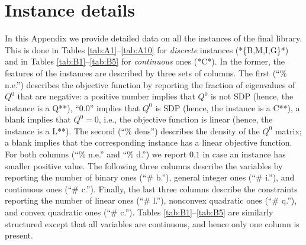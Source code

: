 
\section{Instance details}\label{sec:instance_details}


In this Appendix we provide detailed data on all the instances of the final library. This is done in Tables \ref{tab:A1}--\ref{tab:A10} for \emph{discrete} instances (*\{B,M,I,G\}*) and in Tables \ref{tab:B1}--\ref{tab:B5} for \emph{continuous} ones (*C*). In the former, the features of the instances are described by three sets of columns. The first (``\% n.e.'') describes the objective function by reporting the fraction of eigenvalues of $Q^0$ that are negative: a positive number implies that $Q^0$ is not SDP (hence, the instance is a Q**), ``0.0'' implies that $Q^0$ is SDP (hence, the instance is a C**), a blank implies that $Q^0 = 0$, i.e., the objective function is linear (hence, the instance is a L**). 
The second (``\% dens'') describes the density of the $Q^0$ matrix; a blank implies that the corresponding instance has a linear objective function.
For both columns (``\% n.e.'' and ``\% d.'') we report $0.1$ in case an instance has smaller positive value.
The following three columns describe the variables by reporting the number of binary ones (``\# b.''), general integer ones (``\# i.''), and continuous ones (``\# c.''). Finally, the last three columns describe the constraints reporting the number of linear ones (``\# l.''), nonconvex quadratic ones (``\# q.''), and convex quadratic ones (``\# c.''). Tables \ref{tab:B1}--\ref{tab:B5} are similarly structured except that all variables are continuous, and hence only one column is present.



